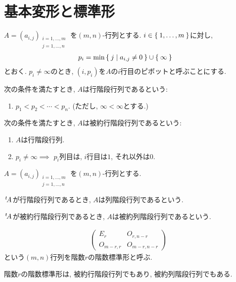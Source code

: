 \section{基本変形と標準形}
\begin{definition}
  $A=(a_{i,j})_{\substack{i=1,\ldots,m\\j=1,\ldots,n}}$
  を$(m,n)$-行列とする.
  $i\in\Set{1,\ldots,m}$に対し,
  \begin{align*}
    p_i&=\min\Set{j|a_{i,j}\neq 0} \cup \Set{\infty}
  \end{align*}
  とおく.
  $p_i\neq \infty$のとき,
  $(i,p_i)$を$A$の$i$行目のピボットと呼ぶことにする.

  次の条件を満たすとき, $A$は行階段行列であるという:
  \begin{enumerate}
  \item $p_1<p_2<\cdots<p_n$.
      (ただし, $\infty<\infty$とする.)
  \end{enumerate}
  次の条件を満たすとき, $A$は被約行階段行列であるという:
  \begin{enumerate}
  \item $A$は行階段行列.
  \item $p_i\neq \infty\implies$ $p_i$列目は, $i$行目は$1$, それ以外は$0$.
  \end{enumerate}
\end{definition}
\begin{definition}
  $A=(a_{i,j})_{\substack{i=1,\ldots,m\\j=1,\ldots,n}}$
  を$(m,n)$-行列とする.
  
  $\left.^{t}\!A\right.$が行階段行列であるとき,
  $A$は列階段行列であるという.

  $\left.^{t}\!A\right.$が被約行階段行列であるとき,
  $A$は被約列階段行列であるという.
\end{definition}

\begin{definition}
  \begin{align*}
    \left(
    \begin{array}{c|c}
      E_r&O_{r,n-r}\\
      O_{m-r,r}&O_{m-r,n-r}
    \end{array}
    \right)
  \end{align*}
  という$(m,n)$行列を階数$r$の階数標準形と呼ぶ.
\end{definition}
\begin{remark}
  階数$r$の階数標準形は,
  被約行階段行列でもあり,
  被約列階段行列でもある.
\end{remark}

